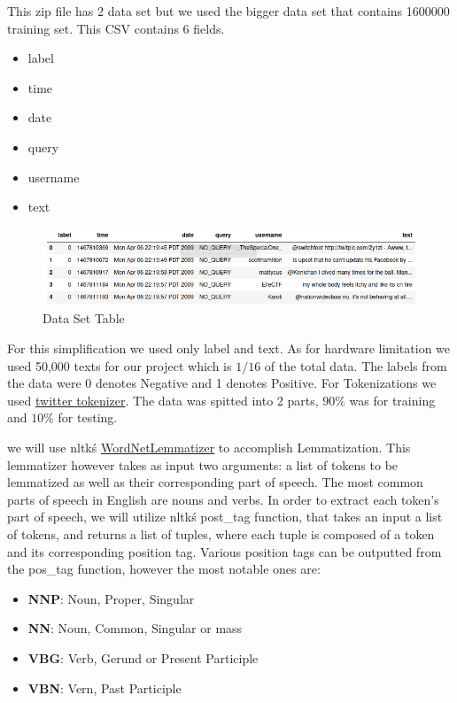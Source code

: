 \documentclass{article}
\begin{document}
This zip file has 2 data set but we used the bigger data set that contains 1600000 training set. This CSV contains 6 fields. 

\begin{itemize}
    \item label
    \item time
    \item date
    \item query
    \item username
    \item text
\end{itemize}

\begin{figure}[h!]
    \centering
    \includegraphics[width=12cm]{dataset.png}
    \caption{Data Set Table}
    \label{fig:dataset}
\end{figure}

For this simplification we used only label and text. As for hardware limitation we used 50,000 texts for our project which is $1/16$ of the total data. The labels from the data were 0 denotes Negative and 1 denotes Positive. For Tokenizations we used \href{https://www.nltk.org/api/nltk.tokenize.html#module-nltk.tokenize.casual}{twitter tokenizer}. The data was spitted into 2 parts, $90\%$ was for training and $10\%$ for testing.

we will use nltk\'s \href{https://www.ling.upenn.edu/courses/Fall_2003/ling001/penn_treebank_pos.html}{WordNetLemmatizer} to accomplish Lemmatization. This lemmatizer however takes as input two arguments: a list of tokens to be lemmatized as well as their corresponding part of speech. The most common parts of speech in English are nouns and verbs. In order to extract each token's part of speech, we will utilize nltk\'s post\_tag function, that takes an input a list of tokens, and returns a list of tuples, where each tuple is composed of a token and its corresponding position tag. Various position tags can be outputted from the pos\_tag function, however the most notable ones are:

\begin{itemize}
    \item \textbf{NNP}: Noun, Proper, Singular
    \item \textbf{NN}: Noun, Common, Singular or mass
    \item \textbf{VBG}: Verb, Gerund or Present Participle
    \item \textbf{VBN}: Vern, Past Participle
\end{itemize}
\end{document}

